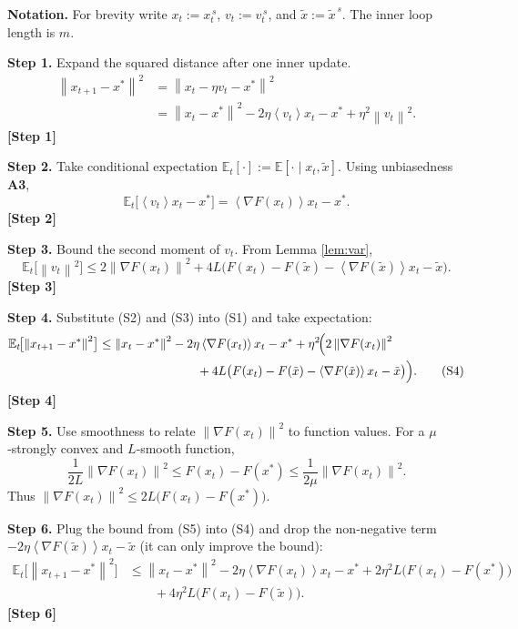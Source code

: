 \documentclass{article}
\newcommand{\E}{\mathbb{E}}
\newcommand{\norm}[1]{\left\|#1\right\|}
\newcommand{\inner}[1]{\left\langle #1 \right\rangle}
\begin{document}
\noindent\textbf{Notation.} For brevity write $x_t:=x_{t}^{\,s}$, $v_t:=v_{t}^{\,s}$, and $\tilde{x}:=\tilde{x}^{\,s}$. The inner loop length is $m$.

\noindent\textbf{Step 1.} Expand the squared distance after one inner update.  
\begin{align}
\norm{x_{t+1}-x^{*}}^{2}
&=\norm{x_t-\eta v_t -x^{*}}^{2}\nonumber\\
&=\norm{x_t-x^{*}}^{2}
   -2\eta\inner{v_t}{x_t-x^{*}}
   +\eta^{2}\norm{v_t}^{2}.
\tag{S1}
\end{align}
\textbf{[Step 1]}

\noindent\textbf{Step 2.} Take conditional expectation $\E_t[\cdot]:=\E[\cdot\mid x_t,\tilde{x}]$.  
Using unbiasedness \textbf{A3},
\[
\E_t\!\bigl[\inner{v_t}{x_t-x^{*}}\bigr]
   =\inner{\nabla F(x_t)}{x_t-x^{*}}.
\tag{S2}
\]
\textbf{[Step 2]}

\noindent\textbf{Step 3.} Bound the second moment of $v_t$.  
From Lemma \ref{lem:var},
\[
\E_t\!\bigl[\norm{v_t}^{2}\bigr]
\le 2\norm{\nabla F(x_t)}^{2}
   +4L\bigl(F(x_t)-F(\tilde{x})-\inner{\nabla F(\tilde{x})}{x_t-\tilde{x}}\bigr).
\tag{S3}
\]
\textbf{[Step 3]}

\noindent\textbf{Step 4.} Substitute (S2) and (S3) into (S1) and take expectation:
\begin{align}
\E_t\!\bigl[\norm{x_{t+1}-x^{*}}^{2}\bigr]
&\le \norm{x_t-x^{*}}^{2}
   -2\eta\inner{\nabla F(x_t)}{x_t-x^{*}}
   +\eta^{2}\!\Bigl(2\norm{\nabla F(x_t)}^{2}\nonumber\\
&\qquad\qquad\qquad\qquad
   +4L\bigl(F(x_t)-F(\tilde{x})-\inner{\nabla F(\tilde{x})}{x_t-\tilde{x}}\bigr)\Bigr).
\tag{S4}
\end{align}
\textbf{[Step 4]}

\noindent\textbf{Step 5.} Use smoothness to relate $\norm{\nabla F(x_t)}^{2}$ to function values.  
For a $\mu$‑strongly convex and $L$‑smooth function,
\[
\frac{1}{2L}\norm{\nabla F(x_t)}^{2}
    \le F(x_t)-F(x^{*})\le \frac{1}{2\mu}\norm{\nabla F(x_t)}^{2}.
\tag{S5}
\]
Thus $\norm{\nabla F(x_t)}^{2}\le 2L\bigl(F(x_t)-F(x^{*})\bigr)$.

\noindent\textbf{Step 6.} Plug the bound from (S5) into (S4) and drop the non‑negative term $-2\eta\inner{\nabla F(\tilde{x})}{x_t-\tilde{x}}$ (it can only improve the bound):
\begin{align}
\E_t\!\bigl[\norm{x_{t+1}-x^{*}}^{2}\bigr]
&\le \norm{x_t-x^{*}}^{2}
   -2\eta\inner{\nabla F(x_t)}{x_t-x^{*}}
   +2\eta^{2}L\bigl(F(x_t)-F(x^{*})\bigr) \nonumber\\
&\qquad+4\eta^{2}L\bigl(F(x_t)-F(\tilde{x})\bigr).
\tag{S6}
\end{align}
\textbf{[Step 6]}
\end{document}
